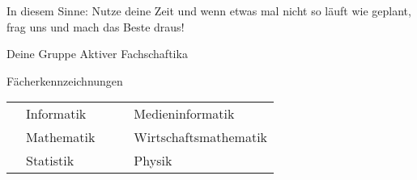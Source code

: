 In diesem Sinne: Nutze deine Zeit und wenn etwas mal nicht so läuft wie geplant, frag uns und mach das Beste draus!

Deine Gruppe Aktiver Fachschaftika
\vfill

\begin{table*}
	\centering
	  Fächerkennzeichnungen
		\begin{tabular}{ l l c l l }
			\subjectI & Informatik &  & \subjectMI & Medieninformatik \\[1.5mm]
			\subjectM & Mathematik &  & \subjectW  & Wirtschaftsmathematik \\[1.5mm]
			\subjectS & Statistik  &  & \subjectP  & Physik
		\end{tabular}
\end{table*}
